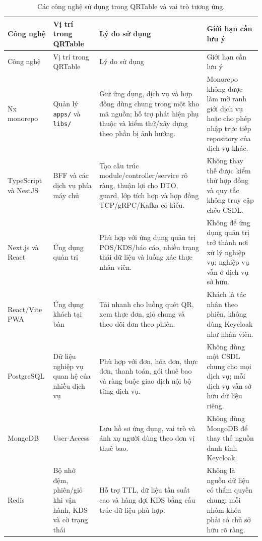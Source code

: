 {\footnotesize
\setlength{\tabcolsep}{3pt}
\begin{longtable}{>{\raggedright\arraybackslash}p{}>{\raggedright\arraybackslash}p{}>{\raggedright\arraybackslash}p{}>{\raggedright\arraybackslash}p{}}
  \caption{Các công nghệ sử dụng trong QRTable và vai trò tương ứng.}
  \label{tab:chapter4-technology-decision}\\
  \toprule
  Công nghệ & Vị trí trong QRTable & Lý do sử dụng & Giới hạn cần lưu ý \\
  \midrule
  \endfirsthead
  \toprule
  Công nghệ & Vị trí trong QRTable & Lý do sử dụng & Giới hạn cần lưu ý \\
  \midrule
  \endhead
  \bottomrule
  \endfoot
  Nx monorepo & Quản lý \texttt{apps/} và \texttt{libs/} & Giữ ứng dụng, dịch vụ và hợp đồng dùng chung trong một kho mã nguồn; hỗ trợ phát hiện phụ thuộc và kiểm thử/xây dựng theo phần bị ảnh hưởng. & Monorepo không được làm mờ ranh giới dịch vụ hoặc cho phép nhập trực tiếp repository của dịch vụ khác. \\
  TypeScript và NestJS & BFF và các dịch vụ phía máy chủ & Tạo cấu trúc module/controller/service rõ ràng, thuận lợi cho DTO, guard, lớp tích hợp và hợp đồng TCP/gRPC/Kafka có kiểu. & Không thay thế được kiểm thử hợp đồng và quy tắc không truy cập chéo CSDL. \\
  Next.js và React & Ứng dụng quản trị & Phù hợp với ứng dụng quản trị POS/KDS/báo cáo, nhiều trạng thái dữ liệu và luồng xác thực nhân viên. & Không để ứng dụng quản trị trở thành nơi xử lý nghiệp vụ; nghiệp vụ vẫn ở dịch vụ sở hữu. \\
  React/Vite PWA & Ứng dụng khách tại bàn & Tải nhanh cho luồng quét QR, xem thực đơn, giỏ chung và theo dõi đơn theo phiên. & Khách là tác nhân theo phiên, không dùng Keycloak như nhân viên. \\
  PostgreSQL & Dữ liệu nghiệp vụ quan hệ của nhiều dịch vụ & Phù hợp với đơn, hóa đơn, thực đơn, thanh toán, gói thuê bao và ràng buộc giao dịch nội bộ từng dịch vụ. & Không dùng một CSDL chung cho mọi dịch vụ; mỗi dịch vụ vẫn sở hữu dữ liệu riêng. \\
  MongoDB & User-Access & Lưu hồ sơ ứng dụng, vai trò và ánh xạ người dùng theo đơn vị thuê bao. & Không dùng MongoDB để thay thế nguồn danh tính Keycloak. \\
  Redis & Bộ nhớ đệm, phiên/giỏ khi vận hành, KDS và cờ trạng thái & Hỗ trợ TTL, dữ liệu tần suất cao và hàng đợi KDS bằng cấu trúc dữ liệu phù hợp. & Không là nguồn dữ liệu có thẩm quyền chung; mỗi nhóm khóa phải có chủ sở hữu rõ ràng. \\

\end{longtable}}
